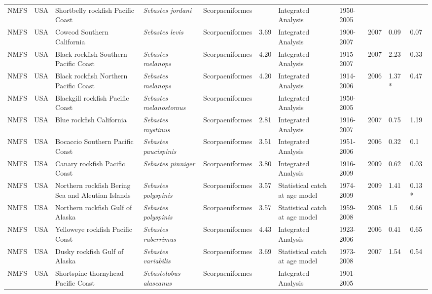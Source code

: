 \begin{longtable}{p{1.5cm}p{1.5cm}p{3cm}p{3cm}p{2.5cm}p{0.9cm}p{1.4cm}p{0.9cm}p{0.9cm}p{0.9cm}p{1cm}}
  NMFS & USA & Shortbelly rockfish Pacific Coast & \textit{Sebastes jordani} & Scorpaeniformes &  & Integrated Analysis & 1950-2005 &  &  &  \\ 
  NMFS & USA & Cowcod Southern California & \textit{Sebastes levis} & Scorpaeniformes & 3.69 & Integrated Analysis & 1900-2007 & 2007 & 0.09 & 0.07 \\ 
  NMFS & USA & Black rockfish Southern Pacific Coast & \textit{Sebastes melanops} & Scorpaeniformes & 4.20 & Integrated Analysis & 1915-2007 & 2007 & 2.23 & 0.33 \\ 
  NMFS & USA & Black rockfish Northern Pacific Coast & \textit{Sebastes melanops} & Scorpaeniformes & 4.20 & Integrated Analysis & 1914-2006 & 2006 & 1.37 * & 0.47 \\ 
  NMFS & USA & Blackgill rockfish  Pacific Coast & \textit{Sebastes melanostomus} & Scorpaeniformes &  & Integrated Analysis & 1950-2005 &  &  &  \\ 
  NMFS & USA & Blue rockfish California & \textit{Sebastes mystinus} & Scorpaeniformes & 2.81 & Integrated Analysis & 1916-2007 & 2007 & 0.75 & 1.19 \\ 
  NMFS & USA & Bocaccio Southern Pacific Coast & \textit{Sebastes paucispinis} & Scorpaeniformes & 3.51 & Integrated Analysis & 1951-2006 & 2006 & 0.32 & 0.1 \\ 
  NMFS & USA & Canary rockfish Pacific Coast & \textit{Sebastes pinniger} & Scorpaeniformes & 3.80 & Integrated Analysis & 1916-2009 & 2009 & 0.62 & 0.03 \\ 
  NMFS & USA & Northern rockfish Bering Sea and Aleutian Islands & \textit{Sebastes polyspinis} & Scorpaeniformes & 3.57 & Statistical catch at age model & 1974-2009 & 2009 & 1.41 & 0.13 * \\ 
  NMFS & USA & Northern rockfish Gulf of Alaska & \textit{Sebastes polyspinis} & Scorpaeniformes & 3.57 & Statistical catch at age model & 1959-2008 & 2008 & 1.5 & 0.66 \\ 
  NMFS & USA & Yelloweye rockfish Pacific Coast & \textit{Sebastes ruberrimus} & Scorpaeniformes & 4.43 & Integrated Analysis & 1923-2006 & 2006 & 0.41 & 0.65 \\ 
  NMFS & USA & Dusky rockfish Gulf of Alaska & \textit{Sebastes variabilis} & Scorpaeniformes & 3.69 & Statistical catch at age model & 1973-2008 & 2007 & 1.54 & 0.54 \\ 
  NMFS & USA & Shortspine thornyhead Pacific Coast & \textit{Sebastolobus alascanus} & Scorpaeniformes &  & Integrated Analysis & 1901-2005 &  &  &  \\ 

\end{longtable}
